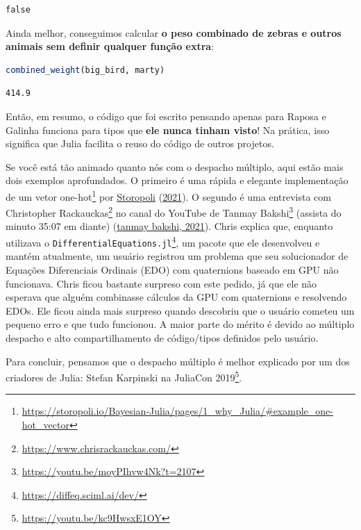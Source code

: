 \documentclass[
  notoc %
]{tufte-book}
\DeclareRobustCommand{\href}[2]{#2\footnote{\url{#1}}}
\newcommand{\passthrough}[1]{#1}
\begin{document}
\begin{lstlisting}[language=Output]
false
\end{lstlisting}

Ainda melhor, conseguimos calcular \textbf{o peso combinado de zebras e
outros animais sem definir qualquer função extra}:

\begin{lstlisting}[language=Julia]
combined_weight(big_bird, marty)
\end{lstlisting}

\begin{lstlisting}[language=Output]
414.9
\end{lstlisting}

Então, em resumo, o código que foi escrito pensando apenas para Raposa e
Galinha funciona para tipos que \textbf{ele nunca tinham visto}! Na
prática, isso significa que Julia facilita o reuso do código de outros
projetos.

Se você está tão animado quanto nós com o despacho múltiplo, aqui estão
mais dois exemplos aprofundados. O primeiro é uma
\href{https://storopoli.io/Bayesian-Julia/pages/1_why_Julia/\#example_one-hot_vector}{rápida
e elegante implementação de um vetor one-hot} por
\protect\hyperlink{ref-storopoli2021bayesianjulia}{Storopoli}
(\protect\hyperlink{ref-storopoli2021bayesianjulia}{2021}). O segundo é
uma entrevista com \href{https://www.chrisrackauckas.com/}{Christopher
Rackauckas} no \href{https://youtu.be/moyPIhvw4Nk?t=2107}{canal do
YouTube de Tanmay Bakshi} (assista do minuto 35:07 em diante)
(\protect\hyperlink{ref-tanmaybakshiBakingKnowledgeMachine2021}{tanmay
bakshi, 2021}). Chris explica que, enquanto utilizava o
\href{https://diffeq.sciml.ai/dev/}{\passthrough{\lstinline!DifferentialEquations.jl!}},
um pacote que ele desenvolveu e mantém atualmente, um usuário registrou
um problema que seu solucionador de Equações Diferenciais Ordinais (EDO)
com quaternions baseado em GPU não funcionava. Chris ficou bastante
surpreso com este pedido, já que ele não esperava que alguém combinasse
cálculos da GPU com quaternions e resolvendo EDOs. Ele ficou ainda mais
surpreso quando descobriu que o usuário cometeu um pequeno erro e que
tudo funcionou. A maior parte do mérito é devido ao múltiplo despacho e
alto compartilhamento de código/tipos definidos pelo usuário.

Para concluir, pensamos que o despacho múltiplo é melhor explicado por
um dos criadores de Julia: \href{https://youtu.be/kc9HwsxE1OY}{Stefan
Karpinski na JuliaCon 2019}.
\end{document}
